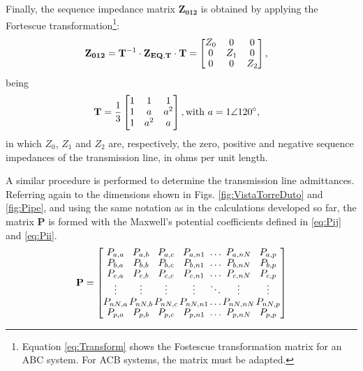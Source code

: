 \documentclass[conference]{IEEEtran}
\begin{document}
	Finally, the sequence impedance matrix $\mathbf{Z_{012}}$ is obtained by applying the Fortescue transformation\footnote{Equation \eqref{eq:Transform} shows the Fostescue transformation matrix for an ABC system. For ACB systems, the matrix must be adapted.}:
	\begin{equation}\label{eq:MatrizImpSeq}
		\begin{aligned}
			\arraycolsep=0.8pt %
			\medmuskip = -2mu %
			\def\arraystretch{1.2}
			&\mathbf{Z_{012}}
			=\mathbf{T}^{-1}
			\cdot\mathbf{Z_{EQ,T}}\cdot\mathbf{T}=
			\begin{bmatrix}
				Z_0 & 0 & 0  \\
				0 & Z_1 & 0 \\
				0 & 0 & Z_2 \\
			\end{bmatrix},
		\end{aligned} 
	\end{equation}
	being
	\begin{equation}\label{eq:Transform}
		\begin{aligned}
			\arraycolsep=0.8pt %
			\medmuskip = -2mu %
			\def\arraystretch{1.2}
			&\mathbf{T}
			=\frac{1}{3}
			\begin{bmatrix}
				1 & 1 & 1  \\
				1 & a & a^2 \\
				1 & a^2 & a \\
			\end{bmatrix}, \textrm{with}~ a=1\angle 120^\circ,
		\end{aligned} 
	\end{equation}
	in which $Z_0$, $Z_1$ and $Z_2$ are, respectively, the zero, positive and negative sequence impedances of the transmission line, in ohms per unit length.
	
	A similar procedure is performed to determine the transmission line admittances. Referring again to the dimensions shown in Figs. \ref{fig:VistaTorreDuto} and \ref{fig:Pipe}, and using the same notation as in the calculations developed so far, the matrix $\mathbf{P}$ is formed with the Maxwell's potential coefficients defined in \eqref{eq:Pij} and \eqref{eq:Pii}.
	\begin{equation}\label{eq:MatrizAdm}
		\arraycolsep=0.7pt %
		\medmuskip = -1mu %
		\def\arraystretch{.9}
		\mathbf{P}
		=
		\begin{bmatrix}
			P_{a,a} & P_{a,b} & P_{a,c} & P_{a,n1} & \ldots & P_{a,nN} & P_{a,p}  \\
			P_{b,a} & P_{b,b} & P_{b,c} & P_{b,n1} & \ldots & P_{b,nN} & P_{b,p}  \\
			P_{c,a} & P_{c,b} & P_{c,c} & P_{c,n1} & \ldots & P_{c,nN} & P_{c,p}  \\
			\vdots & \vdots & \vdots & \vdots & \ddots & \vdots & \vdots  \\
			P_{nN,a} & P_{nN,b} & P_{nN,c} & P_{nN,n1} & \ldots & P_{nN,nN} & P_{nN,p}  \\
			P_{p,a} & P_{p,b} & P_{p,c} & P_{p,n1} & \ldots & P_{p,nN} & P_{p,p}
		\end{bmatrix}
	\end{equation}
	
\end{document}
